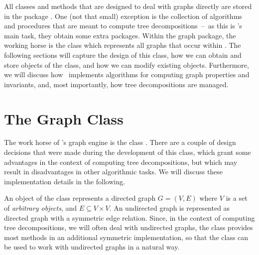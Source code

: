 \documentclass[a4paper, ukenglish, twoside, openright]{jdrasilmanual}
\begin{document}
All classes and methods that are designed to deal with graphs directly
are stored in the package . One (not that small)
exception is the collection of algorithms and procedures that are
meant to compute tree decompositions~–~as this is \Jdrasil's main
task, they obtain some extra packages. Within the graph package, the
working horse is the class  which represents all graphs
that occur within \Jdrasil. The following sections will capture the
design of this class, how we can obtain and store objects of the
class, and how we can modify existing 
objects. Furthermore, we will discuss how \Jdrasil\ implements
algorithms for computing graph properties and invariants, and, most
importantly, how tree decompositions are managed.

\chapter{The Graph Class}
The work horse of \Jdrasil's graph engine is the class
. There are a couple of design decisions
that were made during the development of this class, which grant some
advantages in the context of computing tree decompositions, but which
may result in disadvantages in other algorithmic tasks. We will
discuss these implementation details in the following. 

An object of the  class represents a directed graph
$G=(V, E)$ where $V$ is a set of \emph{arbitrary objects}, and
$E\subseteq V\times V$. An undirected graph is represented as directed
graph with a symmetric edge relation. Since, in the context of
computing tree decompositions, we will often deal with undirected
graphs, the class provides most methods in an additional symmetric
implementation, so that the  class can be used to work
with undirected graphs in a natural way.
\end{document}
